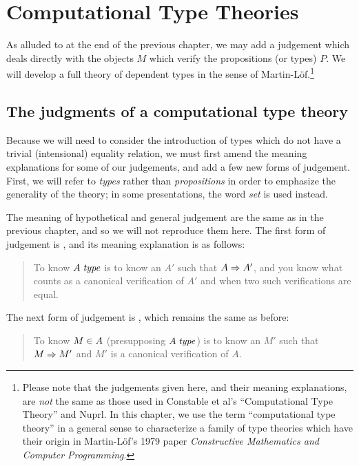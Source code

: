 \documentclass[main.tex]{subfiles}
\begin{document}
\onehalfspacing

\chapter{Computational Type Theories}

As alluded to at the end of the previous chapter, we may add a judgement
 which deals directly with the objects $M$ which verify the
propositions (or types) $P$. We will develop a full theory of dependent types
in the sense of Martin-L\"of.\footnote{Please note that the judgements given here, and
their meaning explanations, are \emph{not} the same as those used in Constable
et al's ``Computational Type Theory'' and Nuprl. In this chapter, we use the
term ``computational type theory'' in a general sense to characterize a family
of type theories which have their origin in Martin-L\"of's 1979 paper
\emph{Constructive Mathematics and Computer Programming}.}

\section{The judgments of a computational type theory}

Because we will need to consider the introduction of types which do not have a
trivial (intensional) equality relation, we must first amend the meaning
explanations for some of our judgements, and add a few new forms of judgement.
First, we will refer to \emph{types} rather than \emph{propositions} in order
to emphasize the generality of the theory; in some presentations, the word
\emph{set} is used instead.

The meaning of hypothetical and general judgement are the same as in
the previous chapter, and so we will not reproduce them here. The
first form of judgement is , and its meaning
explanation is as follows:

\begin{quote}
  To know $A\;\mathit{type}$ is to know an $A'$ such that $A\Rightarrow A'$,
  and you know what counts as a canonical verification of $A'$ and when
  two such verifications are equal.
\end{quote}

The next form of judgement is , which remains
the same as before:

\begin{quote}
  To know $M\in A$ (presupposing $A\;\mathit{type}$) is to know an $M'$ such that
  $M\Rightarrow M'$ and $M'$ is a canonical verification of $A$.
\end{quote}
\end{document}
